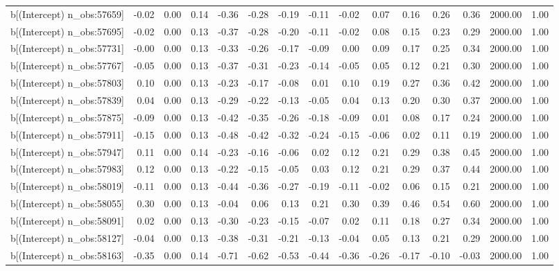 \begin{table}[ht]
\begin{tabular}{rrrrrrrrrrrrrrr}
  b[(Intercept) n\_obs:57659] & -0.02 & 0.00 & 0.14 & -0.36 & -0.28 & -0.19 & -0.11 & -0.02 & 0.07 & 0.16 & 0.26 & 0.36 & 2000.00 & 1.00 \\ 
  b[(Intercept) n\_obs:57695] & -0.02 & 0.00 & 0.13 & -0.37 & -0.28 & -0.20 & -0.11 & -0.02 & 0.08 & 0.15 & 0.23 & 0.29 & 2000.00 & 1.00 \\ 
  b[(Intercept) n\_obs:57731] & -0.00 & 0.00 & 0.13 & -0.33 & -0.26 & -0.17 & -0.09 & 0.00 & 0.09 & 0.17 & 0.25 & 0.34 & 2000.00 & 1.00 \\ 
  b[(Intercept) n\_obs:57767] & -0.05 & 0.00 & 0.13 & -0.37 & -0.31 & -0.23 & -0.14 & -0.05 & 0.05 & 0.12 & 0.21 & 0.30 & 2000.00 & 1.00 \\ 
  b[(Intercept) n\_obs:57803] & 0.10 & 0.00 & 0.13 & -0.23 & -0.17 & -0.08 & 0.01 & 0.10 & 0.19 & 0.27 & 0.36 & 0.42 & 2000.00 & 1.00 \\ 
  b[(Intercept) n\_obs:57839] & 0.04 & 0.00 & 0.13 & -0.29 & -0.22 & -0.13 & -0.05 & 0.04 & 0.13 & 0.20 & 0.30 & 0.37 & 2000.00 & 1.00 \\ 
  b[(Intercept) n\_obs:57875] & -0.09 & 0.00 & 0.13 & -0.42 & -0.35 & -0.26 & -0.18 & -0.09 & 0.01 & 0.08 & 0.17 & 0.24 & 2000.00 & 1.00 \\ 
  b[(Intercept) n\_obs:57911] & -0.15 & 0.00 & 0.13 & -0.48 & -0.42 & -0.32 & -0.24 & -0.15 & -0.06 & 0.02 & 0.11 & 0.19 & 2000.00 & 1.00 \\ 
  b[(Intercept) n\_obs:57947] & 0.11 & 0.00 & 0.14 & -0.23 & -0.16 & -0.06 & 0.02 & 0.12 & 0.21 & 0.29 & 0.38 & 0.45 & 2000.00 & 1.00 \\ 
  b[(Intercept) n\_obs:57983] & 0.12 & 0.00 & 0.13 & -0.22 & -0.15 & -0.05 & 0.03 & 0.12 & 0.21 & 0.29 & 0.37 & 0.44 & 2000.00 & 1.00 \\ 
  b[(Intercept) n\_obs:58019] & -0.11 & 0.00 & 0.13 & -0.44 & -0.36 & -0.27 & -0.19 & -0.11 & -0.02 & 0.06 & 0.15 & 0.21 & 2000.00 & 1.00 \\ 
  b[(Intercept) n\_obs:58055] & 0.30 & 0.00 & 0.13 & -0.04 & 0.06 & 0.13 & 0.21 & 0.30 & 0.39 & 0.46 & 0.54 & 0.60 & 2000.00 & 1.00 \\ 
  b[(Intercept) n\_obs:58091] & 0.02 & 0.00 & 0.13 & -0.30 & -0.23 & -0.15 & -0.07 & 0.02 & 0.11 & 0.18 & 0.27 & 0.34 & 2000.00 & 1.00 \\ 
  b[(Intercept) n\_obs:58127] & -0.04 & 0.00 & 0.13 & -0.38 & -0.31 & -0.21 & -0.13 & -0.04 & 0.05 & 0.13 & 0.21 & 0.29 & 2000.00 & 1.00 \\ 
  b[(Intercept) n\_obs:58163] & -0.35 & 0.00 & 0.14 & -0.71 & -0.62 & -0.53 & -0.44 & -0.36 & -0.26 & -0.17 & -0.10 & -0.03 & 2000.00 & 1.00 \\ 

\end{tabular}
\end{table}

